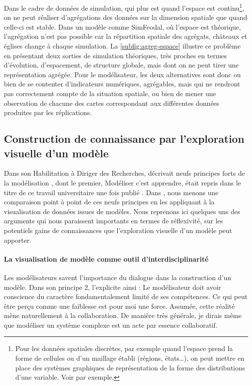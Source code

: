 \noindent Dans le cadre de données de simulation, qui plus est quand l'espace est continu\footnote{
	Pour les données spatiales discrètes, par exemple quand l'espace prend la forme de cellules ou d'un maillage établi (régions, états\ldots), on peut mettre en place des systèmes graphiques de représentation de la forme des distributions d'une variable.
	Voir \textcite{ribecca_chart_2018} par exemple.
}, on ne peut réaliser d'agrégations des données sur la dimension spatiale que quand celle-ci est stable.
Dans un modèle comme SimFeodal, où l'espace est théorique, l'agrégation n'est pas possible car la répartition spatiale des agrégats, châteaux et églises change à chaque simulation.
La \cref{subfig:agreg-espace} illustre ce problème en présentant deux sorties de simulation théoriques, très proches en termes d'évolution, d'espacement, de structure globale, mais dont on ne peut tirer une représentation agrégée.
Pour le modélisateur, les deux alternatives sont donc ou bien de se contenter d'indicateurs numériques, agrégables, mais qui ne rendront pas correctement compte de la situation spatiale, ou bien de mener une observation de chacune des cartes correspondant aux différentes données produites par les réplications.


\subsection{Construction de connaissance par l'exploration visuelle d'un modèle}

Dans son Habilitation à Diriger des Recherches,  décrivait neufs \og principes forts\fg{} de la modélisation \autocite[76--84]{banos_pour_2013}, dont le premier, \og Modéliser c'est apprendre\fg{}, était repris dans le titre de ce travail universitaire une fois publié \autocite{banos_modeliser_2016}.
Dans \textcite[\ppno~\hl{0--N}]{cura_visualisation_2020}, nous menons une comparaison point à point de ces neufs principes en les appliquant à la visualisation de données issues de modèles.
Nous reprenons ici quelques uns des arguments qui nous paraissent importants en termes de réflexivité, sur les potentiels gains de connaissances que l'exploration visuelle d'un modèle peut apporter.


\paragraph{La visualisation de modèle comme outil d'interdisciplinarité}
Les modélisateurs savent l’importance du dialogue dans la construction d’un modèle.
Dans son principe 2, \textcite[77]{banos_pour_2013} l’explicite ainsi :
	\og Le modélisateur doit avoir conscience du caractère fondamentalement limité de ses compétences.
	Ce qui peut être perçu comme une faiblesse est pour moi une force. Assumée, cette réalité mène naturellement à la collaboration.
	De manière très générale, je dirais même que modéliser un système complexe est un acte par essence collaboratif\fg{}.


